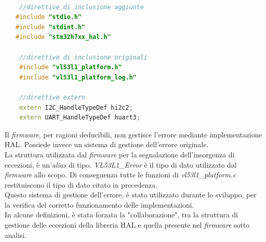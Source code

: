 \begin{lstlisting}[language = Cpp, caption={\textit{path} delle direttive di inclusione di \textit{vl53l1\_platform.c}, in aggiunta la ridefinizione delle variabili di gestione della comunicazione}]

    //direttive di inclusione aggiunte
   #include "stdio.h"
   #include "stdint.h"
   #include "stm32h7xx_hal.h"
    
    //direttive di inclusione originali
    #include "vl53l1_platform.h"
    #include "vl53l1_platform_log.h"

    //direttive extern
    extern I2C_HandleTypeDef hi2c2;
    extern UART_HandleTypeDef huart3;

\end{lstlisting}

Il \textit{firmware}, per ragioni deducibili, non gestisce l'errore mediante implementazione HAL. Possiede invece un sistema di gestione dell'errore originale.\\
La struttura utilizzata dal \textit{firmware} per la segnalazione dell'insorgenza di eccezioni, è un'\textit{alias} di tipo.
\textit{VL53L1\_Error} è il tipo di dato utilizzato dal \textit{firmware} allo scopo. Di conseguenza tutte le funzioni di \textit{vl53l1\_platform.c} restituiscono il tipo di dato citato in precedenza.\\
Questo sistema di gestione dell'errore, è stato utilizzato durante lo sviluppo, per la verifica del corretto funzionamento delle implementazioni.\\
In alcune definizioni, è stata forzata la "collaborazione", tra la struttura di gestione delle eccezioni della libreria HAL e quella presente nel \textit{firmware} sotto analisi.
